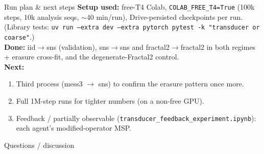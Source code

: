 \documentclass[aspectratio=169]{beamer}
\begin{document}
\begin{frame}{Run plan \& next steps}
\textbf{Setup used:} free-T4 Colab, \texttt{COLAB\_FREE\_T4=True} (100k steps, 10k analysis seqs,
$\sim$40 min/run), Drive-persisted checkpoints per run.
(Library tests: \texttt{uv run --extra dev --extra pytorch pytest -k "transducer or coarse"}.)\\[2mm]
\textbf{Done:} iid$\to$sns (validation), sns$\to$sns and fractal2$\to$fractal2 in both regimes +
erasure cross-fit, and the degenerate-Fractal2 control.\\[1mm]
\textbf{Next:}
\begin{enumerate}
  \item Third process (mess3 $\to$ sns) to confirm the erasure pattern once more.
  \item Full 1M-step runs for tighter numbers (on a non-free GPU).
  \item Feedback / partially observable (\texttt{transducer\_feedback\_experiment.ipynb}):
        each agent's modified-operator MSP.
\end{enumerate}
\end{frame}

\begin{frame}{}
\centering
\Large Questions / discussion
\end{frame}
\end{document}
